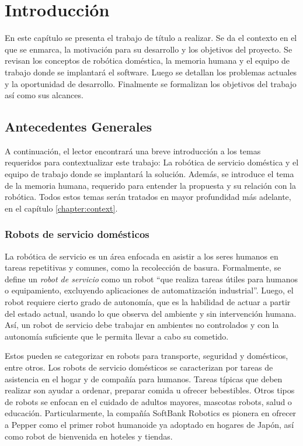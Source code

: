 
\chapter{Introducción}\label{chapter:introduction}

En este capítulo se presenta el trabajo de título a realizar. Se da el contexto en el que se enmarca, la motivación para su desarrollo y los objetivos del proyecto. Se revisan los conceptos de robótica doméstica, la memoria humana y el equipo de trabajo donde se implantará el software. Luego se detallan los problemas actuales y la oportunidad de desarrollo. Finalmente se formalizan los objetivos del trabajo así como sus alcances.


\section{Antecedentes Generales}

A continuación, el lector encontrará una breve introducción a los temas requeridos para contextualizar este trabajo: La robótica de servicio doméstica y el equipo de trabajo donde se implantará la solución. Además, se introduce el tema de la memoria humana, requerido para entender la propuesta y su relación con la robótica. Todos estos temas serán tratados en mayor profundidad más adelante, en el capítulo \ref{chapter:context}.

\subsection{Robots de servicio domésticos}

La robótica de servicio es un área enfocada en asistir a los seres humanos en tareas repetitivas y comunes, como la recolección de basura. Formalmente, se define un \textit{robot de servicio} como un robot ``que realiza tareas útiles para humanos o equipamiento, excluyendo aplicaciones de automatización industrial''\cite{IFR}. Luego, el robot requiere cierto grado de autonomía, que es la habilidad de actuar a partir del estado actual, usando lo que observa del ambiente y sin intervención humana. Así, un robot de servicio debe trabajar en ambientes no controlados y con la autonomía suficiente que le permita llevar a cabo su cometido.

Estos pueden se categorizar en robots para transporte, seguridad y domésticos, entre otros. Los robots de servicio domésticos se caracterizan por tareas de asistencia en el hogar y de compañía para humanos. Tareas típicas que deben realizar son ayudar a ordenar, preparar comida u ofrecer bebestibles. Otros tipos de robots se enfocan en el cuidado de adultos mayores, mascotas robots, salud o educación. Particularmente, la compañía SoftBank Robotics es pionera en ofrecer a Pepper como el primer robot humanoide ya adoptado en hogares de Japón, así como robot de bienvenida en hoteles y tiendas\cite{softbank}.


